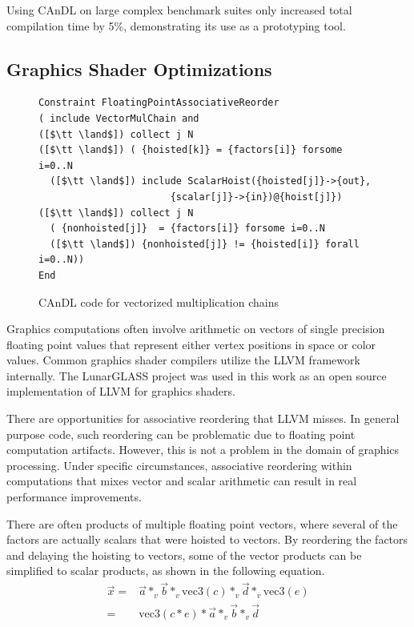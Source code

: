     Using CAnDL on large complex benchmark suites only increased total
    compilation time by 5\%, demonstrating its use as a prototyping tool.

\subsection{Graphics Shader Optimizations}

\begin{figure}[t]
\begin{lstlisting}[language=CAnDL]
Constraint FloatingPointAssociativeReorder
( include VectorMulChain and
([$\tt \land$]) collect j N
([$\tt \land$]) ( {hoisted[k]} = {factors[i]} forsome i=0..N
  ([$\tt \land$]) include ScalarHoist({hoisted[j]}->{out},
                       {scalar[j]}->{in})@{hoist[j]})
([$\tt \land$]) collect j N
  ( {nonhoisted[j]}  = {factors[i]} forsome i=0..N
  ([$\tt \land$]) {nonhoisted[j]} != {hoisted[i]} forall  i=0..N))
End
\end{lstlisting}
\vspace{-0.3cm}
\caption{CAnDL code for vectorized multiplication chains}
\label{fig:Lewis}
\end{figure}

    Graphics computations often involve arithmetic on vectors of single
    precision floating point values that represent either vertex positions in
    space or color values.
    Common graphics shader compilers utilize the LLVM framework internally.
    The LunarGLASS project was used in this work as an open source
    implementation of LLVM for graphics shaders.

    There are opportunities for associative reordering that LLVM misses.
    In general purpose code, such reordering can be problematic due to floating
    point computation artifacts.
    However, this is not a problem in the domain of graphics processing.
    Under specific circumstances, associative reordering within computations
    that mixes vector and scalar arithmetic can result in real performance
    improvements.


    There are often products of multiple floating point vectors, where several
    of the factors are actually scalars that were hoisted to vectors.
    By reordering the factors and delaying the hoisting to vectors, some of the
    vector products can be simplified to scalar products, as shown in the
    following equation.
    \begin{align*}
        \vec x={}&\vec a*_v\vec b*_v\text{vec3}(c)*_v\vec d*_v\text{vec3}(e)\\
        ={}&\text{vec3}(c*e)*\vec a*_v\vec b*_v\vec d
    \end{align*}


